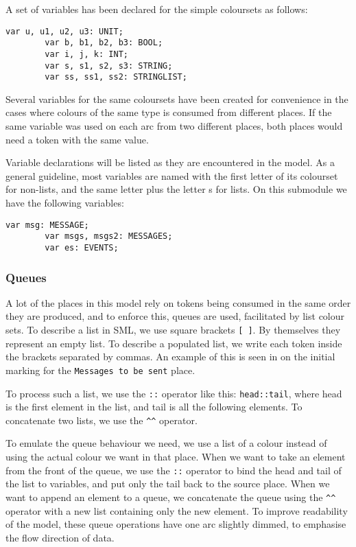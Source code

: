 		A set of variables has been declared for the simple coloursets as follows:
		
		\begin{lstlisting}[label=lst:standard_vars,caption=Simple Colourset Variables]
		var u, u1, u2, u3: UNIT;
		var b, b1, b2, b3: BOOL;
		var i, j, k: INT;
		var s, s1, s2, s3: STRING;
		var ss, ss1, ss2: STRINGLIST;
		\end{lstlisting}
		
		Several variables for the same coloursets have been created for convenience in
		the cases where colours of the same type is consumed from different places. If the same variable was
		used on each arc from two different places, both places would need a token
		with the same value. 
		
		Variable declarations will be listed as they are encountered in the model.
		As a general guideline, most variables are named with the first letter of its
		colourset for non-lists, and the same letter plus the letter s for lists. On
		this submodule we have the following variables:
		
		\begin{lstlisting}[label=lst:client_app_vars,caption=Client Application
		Variables]
		var msg: MESSAGE;
		var msgs, msgs2: MESSAGES;
		var es: EVENTS;
		\end{lstlisting}
	
	\subsubsection{Queues}
	
		A lot of the places in this model rely on tokens being consumed in the same
		order they are produced, and to enforce this, queues are used, facilitated
		by list colour sets. To describe a list in SML, we use square
		brackets \lstinline:[ ]:. By themselves they represent an empty list. To describe a populated list, we
		write each token inside the brackets separated by commas. An example of this
		is seen in  on the initial marking for the
		\lstinline:Messages to be sent: place.
		
		To process such a list, we use the \lstinline-::- operator like this:
		\lstinline-head::tail-, where head is the first element in the list, and tail
		is all the following elements. To concatenate two lists, we use the
		\lstinline:^^: operator. 
		
		To emulate the queue behaviour we need, we use a list of a colour instead of
		using the actual colour we want in that place. When we want to take an
		element from the front of the queue, we use the \lstinline-::- operator to
		bind the head and tail of the list to variables, and put only the tail back to
		the source place. When we want to append an element to a queue, we concatenate
		the queue using the \lstinline:^^: operator with a new list containing only
		the new element. To improve readability of the model, these queue operations
		have one arc slightly dimmed, to emphasise the flow direction of data.
		
